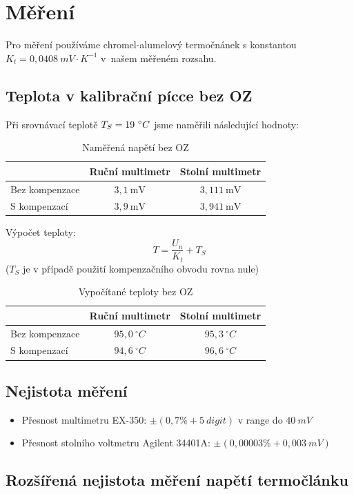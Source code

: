 \documentclass[a4paper,12pt]{article}
\begin{document}
\section{Měření}
Pro měření používáme chromel-alumelový termočnánek s konstantou $K_t = 0,0408\ mV\cdot K^{-1}$ v~našem měřeném rozsahu.
\subsection{Teplota v kalibrační pícce bez OZ}
Při srovnávací teplotě $T_S = 19\ \degree C$ jsme naměřili následující hodnoty:
\begin{table}[H]
\centering
\begin{tabular}{|l|c|c|}
\hline
 & Ruční multimetr & Stolní multimetr \\ \hline
Bez kompenzace & $3,1\ \mathrm{mV}$ & $3,111\ \mathrm{mV}$ \\ \hline
S kompenzací   & $3,9\ \mathrm{mV}$ & $3,941\ \mathrm{mV}$ \\ \hline
\end{tabular}
\caption{Naměřená napětí bez OZ}
\end{table}
Výpočet teploty:
$$
T = \frac{U_n}{K_t} + T_S
$$
($T_S$ je v případě použití kompenzačního obvodu rovna nule)

\begin{table}[H]
\centering
\begin{tabular}{|l|c|c|}
\hline
 & Ruční multimetr & Stolní multimetr \\ \hline
Bez kompenzace & $95{,}0\ ^\circ C$ & $95{,}3\ ^\circ C$ \\ \hline
S kompenzací   & $94{,}6\ ^\circ C$ & $96{,}6\ ^\circ C$ \\ \hline
\end{tabular}
\caption{Vypočítané teploty bez OZ}
\end{table}

\subsection{Nejistota měření}
\begin{itemize}
  \item Přesnost multimetru EX-350: $\pm(0,7\% + 5\ digit)$ v range do $40\ mV$
  \item Přesnost stolního voltmetru Agilent 34401A: $\pm(0,00003\% + 0,003\ mV)$
\end{itemize}

\subsection{Rozšířená nejistota měření napětí termočlánku}
\end{document}
